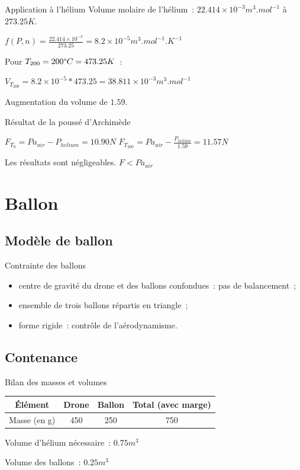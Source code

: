 \begin{frame}{Application à l'hélium}
  Volume molaire de l'hélium~: $22.414\times 10^{-3} m^3.mol^{-1}$ à $273.25K$.
  \begin{center}
    $\displaystyle{f(P, n) = \frac{22.414\times 10^{-3}}{273.25} = 8.2\times 10^{-5} m^3.mol^{-1}.K^{-1}}$
  \end{center}
  Pour $T_{200} = 200 \degree C = 473.25 K$~:
  \begin{center}
    $\displaystyle{V_{T_{200}} = 8.2\times 10^{-5} * 473.25 = 38.811 \times 10^{-3}} m^3.mol^{-1}$
  \end{center}
  Augmentation du volume de $1.59$.
\end{frame}

\begin{frame}{Résultat de la poussé d'Archimède}
  \begin{center}
    $\displaystyle{F_{T_0} = Pa_{air} - P_{helium} = 10.90 N}$
    \bigbreak
    $\displaystyle{F_{T_{200}} = Pa_{air} - \frac{P_{helium}}{1.59} = 11.57 N}$ \\
  \end{center}
  Les résultats sont négligeables. $F < Pa_{air}$
\end{frame}


\section{Ballon}

\subsection{Modèle de ballon}

\begin{frame}{Contrainte des ballons}
	\begin{itemize}
		\item centre de gravité du drone et des ballons confondues~: pas de balancement~;
		\item ensemble de trois ballons répartis en triangle~;
		\item forme rigide~: contrôle de l'aérodynamisme.
	\end{itemize}
\end{frame}

\subsection{Contenance}

\begin{frame}{Bilan des masses et volumes}
	\begin{center}
		\begin{tabular}{|c|c|c|c|}
			\hline
			Élément & Drone & Ballon & Total (avec marge) \\
			\hline
			Masse (en g) & 450 & 250 & 750 \\
			\hline
		\end{tabular}

	\end{center}

  Volume d'hélium nécessaire~: $0.75 m^3$
  
  Volume des ballons~: $0.25 m^3$
\end{frame}

